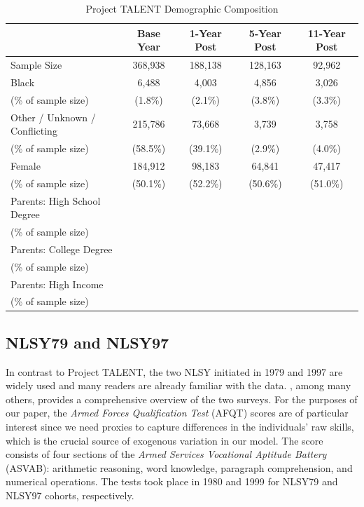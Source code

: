\documentclass[onehalfspacing,11pt]{article}
\begin{document}
\begin{table}[h!]
  \centering 
  \begin{tabular}{lcccc}
\toprule
   & Base Year & 1-Year Post & 5-Year Post & 11-Year Post\\
   \midrule
Sample Size & 368,938 & 188,138 & 128,163 & 92,962 \\
\midrule
Black   & 6,488 & 4,003 & 4,856 & 3,026 \\

\quad (\% of sample size) & (1.8\%) & (2.1\%) & (3.8\%) & (3.3\%) \\
%
\midrule
Other / Unknown / Conflicting & 215,786 & 73,668 & 3,739 & 3,758 \\
\quad (\% of sample size) & (58.5\%) & (39.1\%) & (2.9\%) & (4.0\%) \\
\midrule
Female   & 184,912 & 98,183 & 64,841 & 47,417 \\
\quad (\% of sample size) & (50.1\%) & (52.2\%) & (50.6\%) & (51.0\%) \\
\midrule
Parents: High School Degree & & & & \\
\quad (\% of sample size) & & & & \\
\midrule
Parents: College Degree & & & & \\
\quad (\% of sample size) & & & & \\
\midrule
Parents: High Income & & & & \\
\quad (\% of sample size) & & & & \\
\midrule
\bottomrule
\end{tabular}

\caption{Project TALENT Demographic Composition}
\label{tab:samplebywave}
\end{table}

\subsection{NLSY79 and NLSY97}
In contrast to Project TALENT, the two NLSY initiated in 1979 and 1997 are widely used and many readers are already familiar with the data. \cite{Cooksey:2018}, among many others, provides a comprehensive overview of the two surveys. For the purposes of our paper, the {\it Armed Forces Qualification Test} (AFQT) scores are of particular interest since we need proxies to capture differences in the individuals' raw skills, which is the crucial source of exogenous variation in our model. The score consists of four sections of the {\it Armed Services Vocational Aptitude Battery} (ASVAB): arithmetic reasoning, word knowledge, paragraph comprehension, and numerical operations. The tests took place in 1980 and 1999 for NLSY79 and NLSY97 cohorts, respectively.
\end{document}
